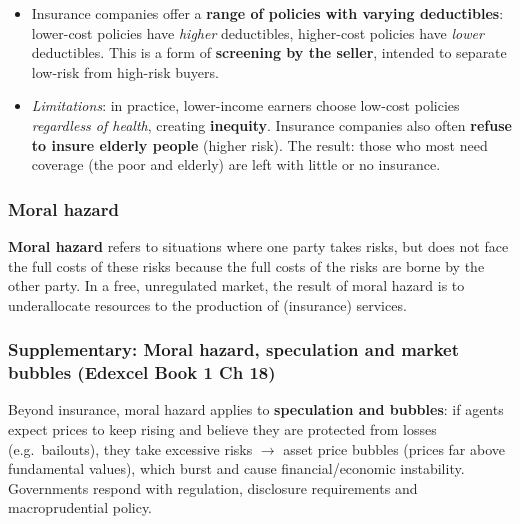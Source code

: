 \documentclass[a4paper,12pt]{article}
\newcommand{\needbold}[1]{\textcolor{red!70!black}{\textbf{#1}}}
\begin{document}
\begin{itemize}
\begin{itemize}
\begin{itemize}
      \item Insurance companies offer a \textbf{range of policies with varying deductibles}: lower-cost policies have \textit{higher} deductibles, higher-cost policies have \textit{lower} deductibles. This is a form of \textbf{screening by the seller}, intended to separate low-risk from high-risk buyers.
      \item \textit{Limitations}: in practice, lower-income earners choose low-cost policies \textit{regardless of health}, creating \textbf{inequity}. Insurance companies also often \textbf{refuse to insure elderly people} (higher risk). The result: those who most need coverage (the poor and elderly) are left with little or no insurance.
    \end{itemize}
  \end{itemize}
\end{itemize}
\subsubsection*{Moral hazard}
\needbold{Moral hazard} refers to situations where one party takes risks, but does not face the full costs of these risks because the full costs of the risks are borne by the other party. In a free, unregulated market, the result of moral hazard is to underallocate resources to the production of (insurance) services.
\subsubsection*{Supplementary: Moral hazard, speculation and market bubbles (Edexcel Book 1 Ch 18)}
Beyond insurance, moral hazard applies to \textbf{speculation and bubbles}: if agents expect prices to keep rising and believe they are protected from losses (e.g.\ bailouts), they take excessive risks $\to$ asset price bubbles (prices far above fundamental values), which burst and cause financial/economic instability. Governments respond with regulation, disclosure requirements and macroprudential policy.
\end{document}
